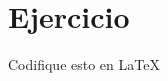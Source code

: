 \section{Ejercicio}

\begin{frame}
	\begin{block}{Codifique esto en \LaTeX}\end{block}

	\pause

	\inputminted[fontsize=\tiny,linenos,frame=single]{latex}{solution1.tex}
\end{frame}
